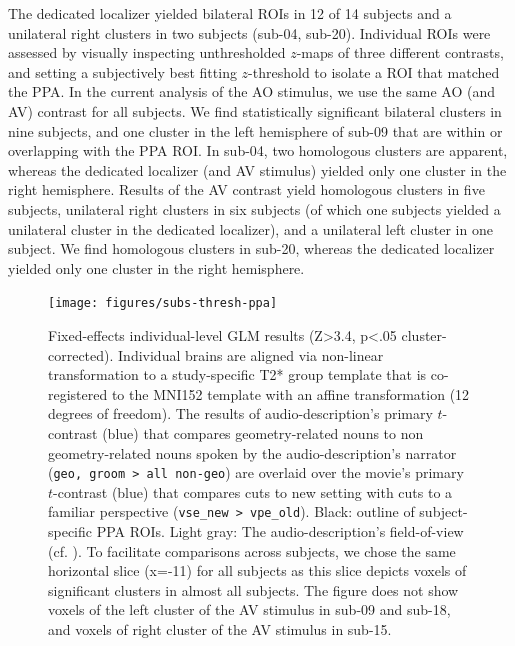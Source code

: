 \documentclass[english]{article}
\begin{document}
The dedicated localizer \citep{sengupta2016extension} yielded bilateral ROIs in
12 of 14 subjects and a unilateral right clusters in two subjects (sub-04,
sub-20).
Individual ROIs were assessed by visually inspecting unthresholded $z$-maps of
three different contrasts, and setting a subjectively best fitting $z$-threshold
to isolate a ROI that matched the PPA.
In the current analysis of the AO stimulus, we use the same AO (and AV) contrast
for all subjects. We find statistically significant bilateral clusters in nine
subjects, and one cluster in the left hemisphere of sub-09 that are within or
overlapping with the PPA ROI.
In sub-04, two homologous clusters are apparent, whereas the dedicated localizer
(and AV stimulus) yielded only one cluster in the right hemisphere.
Results of the AV contrast yield homologous clusters in five subjects,
unilateral right clusters in six subjects (of which one subjects yielded a
unilateral cluster in the dedicated localizer), and a unilateral left cluster in
one subject.
We find homologous clusters in sub-20, whereas the dedicated localizer yielded
only one cluster in the right hemisphere.


\begin{figure} \centering
    \texttt{[image: figures/subs-thresh-ppa]}
    \caption{Fixed-effects individual-level GLM results (Z>3.4, p<.05
        cluster-corrected).
        Individual brains are aligned via non-linear
        transformation to a study-specific T2* group template that is
        co-registered to the MNI152 template with an affine transformation (12
        degrees of freedom).
        The results of audio-description's primary
        $t$-contrast (blue) that compares geometry-related nouns to non
        geometry-related nouns spoken by the audio-description's narrator
        (\texttt{geo, groom > all non-geo}) are overlaid over the movie's
        primary $t$-contrast (blue) that compares cuts to new setting with cuts
        to a familiar perspective (\texttt{vse\_new > vpe\_old}).
        Black:
        outline of subject-specific PPA ROIs.
        Light gray: The
        audio-description's field-of-view (cf. \citep{hanke2014audiomovie}).
        To facilitate comparisons across subjects, we chose the same horizontal
        slice (x=-11) for all subjects as this slice depicts voxels of
        significant clusters in almost all subjects.
        The figure does not show voxels of the left cluster of the AV stimulus
        in sub-09 and sub-18, and voxels of right cluster of the AV stimulus in
        sub-15.}
    \label{fig:subs-thresh-ppa}
\end{figure}
\end{document}
